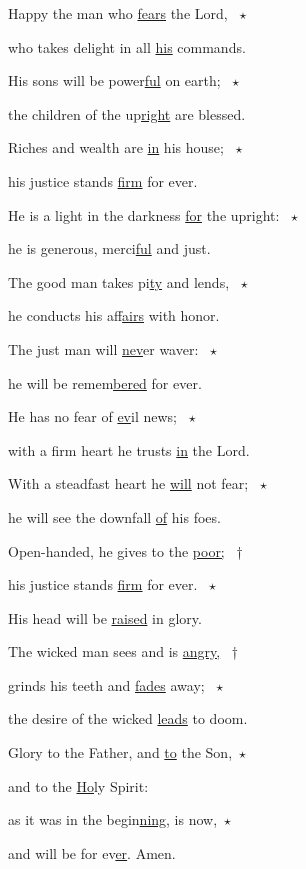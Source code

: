 \noindent Happy the man who \uline{fears} the Lord, ~$\star$~\nopagebreak

who takes delight in all \uline{his} commands.

\noindent His sons will be power\uline{ful} on earth; ~$\star$~\nopagebreak

the children of the up\uline{right} are blessed.

\noindent Riches and wealth are \uline{in} his house; ~$\star$~\nopagebreak

his justice stands \uline{firm} for ever.

\noindent He is a light in the darkness \uline{for} the upright: ~$\star$~\nopagebreak

he is generous, merci\uline{ful} and just.

\noindent The good man takes pi\uline{ty} and lends, ~$\star$~\nopagebreak

he conducts his af\uline{fairs} with honor.

\noindent The just man will \uline{nev}er waver: ~$\star$~\nopagebreak

he will be remem\uline{bered} for ever.

\noindent He has no fear of \uline{ev}il news; ~$\star$~\nopagebreak

with a firm heart he trusts \uline{in} the Lord.

\noindent With a steadfast heart he \uline{will} not fear; ~$\star$~\nopagebreak

he will see the downfall \uline{of} his foes.

\noindent Open-handed, he gives to the \uline{poor;} ~†~\nopagebreak

his justice stands \uline{firm} for ever. ~$\star$~\nopagebreak

His head will be \uline{raised} in glory.

\noindent The wicked man sees and is \uline{angry,} ~†~\nopagebreak

grinds his teeth and \uline{fades} away; ~$\star$~\nopagebreak

the desire of the wicked \uline{leads} to doom.

\noindent Glory to the Father, and \uline{to} the Son,~$\star$~\nopagebreak

and to the \uline{Ho}ly Spirit:

\noindent as it was in the begin\uline{ning}, is now,~$\star$~\nopagebreak

and will be for ev\uline{er}. Amen.
